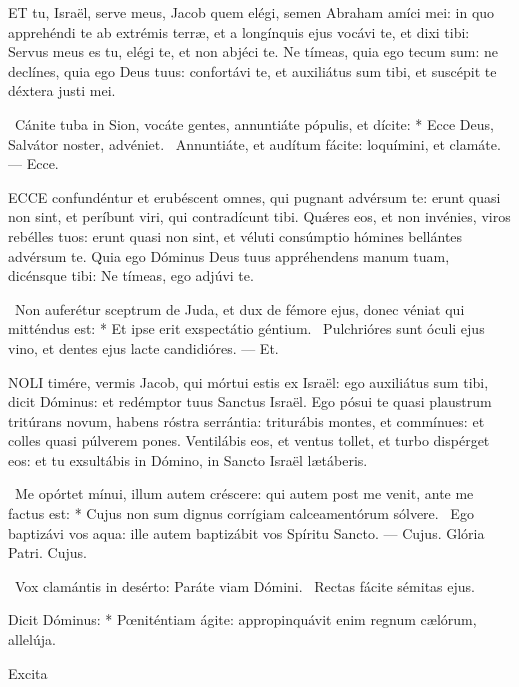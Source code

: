 \lettrine[lines=2]{E}{T} tu, Israël, serve meus, Jacob quem elégi, semen Abraham amíci mei: in quo apprehéndi te ab extrémis terræ, et a longínquis ejus vocávi te, et dixi tibi: Servus meus es tu, elégi te, et non abjéci te. Ne tímeas, quia ego tecum sum: ne declínes, quia ego Deus tuus: confortávi te, et auxiliátus sum tibi, et suscépit te déxtera justi mei.

\R\ Cánite tuba in Sion, vocáte gentes, annuntiáte pópulis, et dícite: * Ecce Deus, Salvátor noster, advéniet. \V\ Annuntiáte, et audítum fácite: loquímini, et clamáte. --- Ecce.


\lettrine[lines=2]{E}{CCE} confundéntur et erubéscent omnes, qui pugnant advérsum te: erunt quasi non sint, et períbunt viri, qui contradícunt tibi. Quǽres eos, et non invénies, viros rebélles tuos: erunt quasi non sint, et véluti consúmptio hómines bellántes advérsum te. Quia ego Dóminus Deus tuus appréhendens manum tuam, dicénsque tibi: Ne tímeas, ego adjúvi te.

\R\ Non auferétur sceptrum de Juda, et dux de fémore ejus, donec véniat qui mitténdus est: * Et ipse erit exspectátio géntium. \V\ Pulchrióres sunt óculi ejus vino, et dentes ejus lacte candidióres. --- Et.


\lettrine[lines=2]{N}{OLI} timére, vermis Jacob, qui mórtui estis ex Israël: ego auxiliátus sum tibi, dicit Dóminus: et redémptor tuus Sanctus Israël. Ego pósui te quasi plaustrum tritúrans novum, habens róstra serrántia: triturábis montes, et commínues: et colles quasi púlverem pones. Ventilábis eos, et ventus tollet, et turbo dispérget eos: et tu exsultábis in Dómino, in Sancto Israël lætáberis.

\R\ Me opórtet mínui, illum autem créscere: qui autem post me venit, ante me factus est: * Cujus non sum dignus corrígiam calceamentórum sólvere. \V\ Ego baptizávi vos aqua: ille autem baptizábit vos Spíritu Sancto. --- Cujus. Glória Patri. Cujus.

\V\ Vox clamántis in desérto: Paráte viam Dómini. \R\ Rectas fácite sémitas ejus.

 Dicit Dóminus: * Pœniténtiam ágite: appropinquávit enim regnum cælórum, allelúja.


 Excita 

